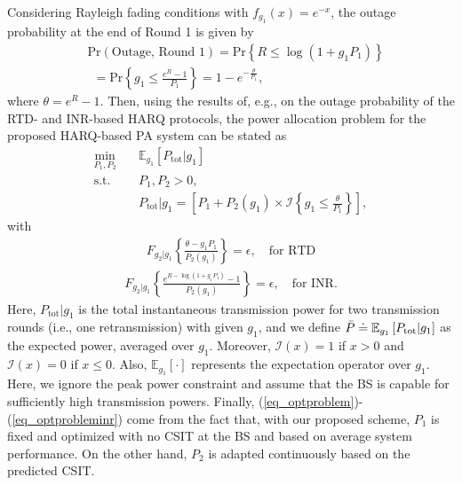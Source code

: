 Considering Rayleigh fading conditions with $f_{g_1}(x) =  e^{- x}$, the outage probability at the end of Round 1 is given by
\begin{align}\label{eq_pout}
&\text{Pr}(\text{Outage, Round 1}) = \text{Pr}\left\{R\leq \log(1+g_1P_1)\right\}\nonumber\\
&~~ = \text{Pr}\left\{g_1\leq \frac{e^{R}-1}{P_1}\right\}
 = 1-e^{ -\frac{\theta}{P_1}}, 
\end{align}
where $\theta = e^{R}-1$. Then, using the results of, e.g.,  \cite[Eq. 7, 18]{makki2014green} on the outage probability of the RTD- and INR-based HARQ protocols, the power allocation problem for the proposed HARQ-based PA system can be stated as
\begin{equation}
\label{eq_optproblem}
\begin{aligned}
\min_{P_1,P_2} \quad & \mathbb{E}_{g_1}\left[P_\text{tot}|g_1\right] \\
\textrm{s.t.} \quad &  P_1, P_2 > 0,\\
&P_\text{tot}|g_1 = \left[P_1 + P_2(g_1) \times \mathcal{I}\left\{g_1 \le \frac{\theta}{P_1}\right\}\right],
\end{aligned}
\end{equation}
with
\begin{align}\label{eq_optproblemrtd}
F_{g_2|g_1}\left\{\frac{\theta-g_1P_1}{P_2(g_1)}    \right\} = \epsilon, \quad\text{for RTD}
\end{align}
\begin{align}\label{eq_optprobleminr}
F_{g_2|g_1}\left\{\frac{e^{R-\log(1+g_1P_1)}-1}{P_2(g_1)}    \right\} = \epsilon, \quad\text{for INR}. 
\end{align}
Here, $P_\text{tot}|g_1$ is the total instantaneous transmission power for two transmission rounds (i.e., one retransmission) with given $g_1$, and we define $\Bar{P} \doteq \mathbb{E}_{g_1}\left[P_\text{tot}|g_1\right]$ as the expected power, averaged over $g_1$. Moreover, $\mathcal{I}(x)=1$ if $x>0$ and $\mathcal{I}(x)=0$ if $x \le 0$. Also, $\mathbb{E}_{g_1}[\cdot]$ represents the expectation operator over $g_1$. Here, we ignore the peak power constraint and assume that the BS is capable for  sufficiently high transmission powers. Finally, (\ref{eq_optproblem})-(\ref{eq_optprobleminr}) come from the fact that, with our proposed scheme, $P_1$ is fixed and optimized with no CSIT at the BS and based on average system performance. On the other hand, $P_2$ is adapted continuously based on the predicted CSIT.


